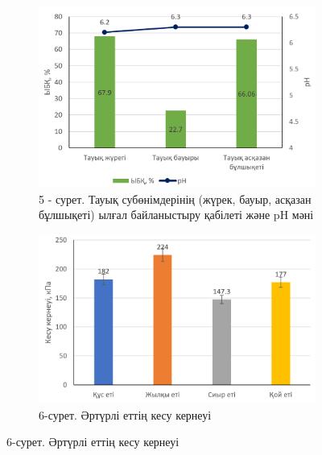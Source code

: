 \begin{figure}[H]
	\centering
	\begin{subfigure}{0.48\textwidth}
		\centering
		\includegraphics[width=\textwidth]{media/pish/image8}
		\caption*{5 - сурет. Тауық субөнімдерінің (жүрек, бауыр, асқазан бұлшықеті) ылғал байланыстыру қабілеті және pH мәні}
	\end{subfigure}
	\begin{subfigure}{0.48\textwidth}
		\centering
		\includegraphics[width=\textwidth]{media/pish/image9}
		\caption*{6-сурет. Әртүрлі еттің кесу кернеуі}
	\end{subfigure}
\end{figure}

